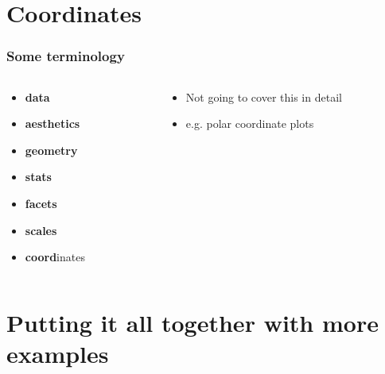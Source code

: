 \documentclass{beamer}\usepackage[]{graphicx}\usepackage[]{color}
\begin{document}

\section*{Coordinates}
\frame{\sectionpage}


\begin{frame}[fragile]
\frametitle{Some terminology}
\begin{columns}[t]

\begin{column}[T]{3cm}
\begin{itemize}
    \item \textbf{\color{gray}data}
    \item \textbf{\color{gray}aesthetics}
    \item \textbf{\color{gray}geometry}
    \item \textbf{\color{gray}stats}
    \item \textbf{\color{gray}facets}
    \item \textbf{\color{gray}scales}
    \item \textbf{coord}inates
\end{itemize}
\end{column}

\begin{column}[T]{8cm}
\begin{itemize}
    \item Not going to cover this in detail
    \item e.g. polar coordinate plots
\end{itemize}
\end{column}

\end{columns}
\end{frame}


\section*{Putting it all together with more examples}
\frame{\sectionpage}
\end{document}
